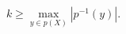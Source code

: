 \setcounter{equation}{13}
\begin{equation}
k\geq\max_{y\in p(X)}|p^{-1}(y)|.
\label{eq:receiptcapacity}
\end{equation}
